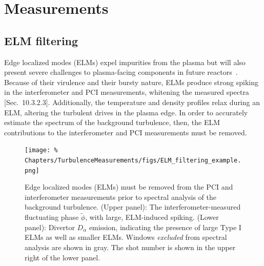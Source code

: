 \section{Measurements}


\subsection{ELM filtering}
Edge localized modes (ELMs) expel impurities from the plasma but
will also present severe challenges to plasma-facing components
in future reactors~\cite[Sec.~7.17]{wesson}.
Because of their virulence and their bursty nature,
ELMs produce strong spiking in the interferometer and PCI measurements,
whitening the measured spectra
[Sec.~10.3.2.3]\cite{bendat_and_piersol}.
Additionally, the temperature and density profiles relax during an ELM,
altering the turbulent drives in the plasma edge.
In order to accurately estimate
the spectrum of the background turbulence, then,
the ELM contributions to the interferometer and PCI measurements
must be removed.

\begin{figure}
  \centering
  \texttt{[image: \%
    Chapters/TurbulenceMeasurements/figs/ELM\_filtering\_example.png]}
  \caption[ELM filtering]{%
    Edge localized modes (ELMs) must be removed
    from the PCI and interferometer measurements
    prior to spectral analysis of the background turbulence.
    (Upper panel): The interferometer-measured
    fluctuating phase $\tilde{\phi}$,
    with large, ELM-induced spiking.
    (Lower panel): Divertor $D_{\alpha}$ emission,
    indicating the presence of large Type I ELMs
    as well as smaller ELMs.
    Windows \emph{excluded} from spectral analysis are shown in gray.
    The \diiid\space shot number is shown in the upper right
    of the lower panel.
  }
\label{fig:TurbulenceMeasurements:ELM_filtering_example}
\end{figure}

